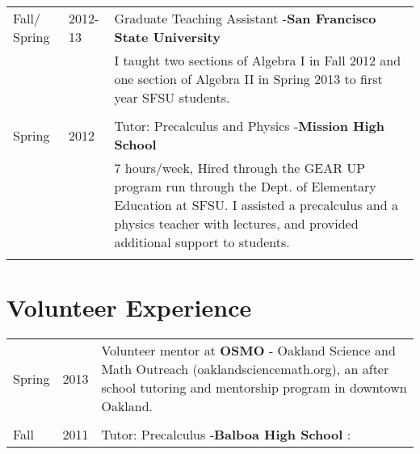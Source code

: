 \documentclass[margin,line,pifont,palatino,courier]{res}
\begin{document}
\begin{resume}
\begin{tabular}{@{}p{0.75in}p{0.5in}p{4in}}
Fall/ Spring & 2012-13  & Graduate Teaching Assistant -{\bf San Francisco State University }  \\
  & 			& 	I taught two sections of Algebra I in Fall 2012  and one section of Algebra II  in Spring 2013 to first year SFSU students.  \\
  		    \\  
		




Spring & 2012 & Tutor:  Precalculus and Physics -{\bf  Mission High School}\\

  &    &    7 hours/week, Hired through the GEAR UP program run through the Dept. of Elementary Education at SFSU.  I assisted a precalculus and a physics teacher with lectures, and provided additional support to students.  \\
  \\

\end{tabular}

\section{Volunteer Experience}
\begin{tabular}{@{}p{0.75in}p{0.5in}p{4in}}
Spring & 2013 & Volunteer mentor at {\bf OSMO} - Oakland Science and Math Outreach (oaklandsciencemath.org), an after school tutoring and mentorship program  in downtown Oakland. 


\\ \\

Fall & 2011 &  Tutor: Precalculus  -{\bf Balboa High School}  :\\


\end{tabular}
\end{resume}
\end{document}

